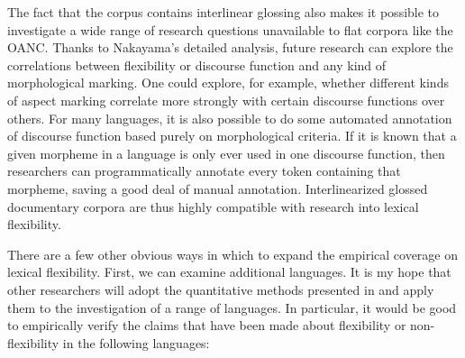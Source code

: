 The fact that the  corpus contains interlinear glossing also makes it possible to investigate a wide range of research questions unavailable to flat corpora like the OANC. Thanks to Nakayama's detailed analysis, future research can explore the correlations between flexibility or discourse function and any kind of morphological marking. One could explore, for example, whether different kinds of aspect marking correlate more strongly with certain discourse functions over others. For many languages, it is also possible to do some automated annotation of discourse function based purely on morphological criteria. If it is known that a given morpheme in a language is only ever used in one discourse function, then researchers can programmatically annotate every token containing that morpheme, saving a good deal of manual annotation. Interlinearized glossed documentary corpora are thus highly compatible with research into lexical flexibility.

There are a few other obvious ways in which to expand the empirical coverage on lexical flexibility. First, we can examine additional languages. It is my hope that other researchers will adopt the quantitative methods presented in  and apply them to the investigation of a range of languages. In particular, it would be good to empirically verify the claims that have been made about flexibility or non-flexibility in the following languages:

